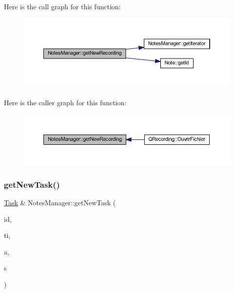 Here is the call graph for this function\+:\nopagebreak
\begin{figure}[H]
\begin{center}
\leavevmode
\includegraphics[width=350pt]{class_notes_manager_a71d0bc2e2716a4e558705ea76e3ad491_cgraph}
\end{center}
\end{figure}
Here is the caller graph for this function\+:\nopagebreak
\begin{figure}[H]
\begin{center}
\leavevmode
\includegraphics[width=350pt]{class_notes_manager_a71d0bc2e2716a4e558705ea76e3ad491_icgraph}
\end{center}
\end{figure}
\mbox{\label{class_notes_manager_a39562bf5aef0d7a113317c1421d578fd}} 
\subsubsection{\texorpdfstring{get\+New\+Task()}{getNewTask()}}
{\footnotesize\ttfamily \hyperlink{class_task}{Task} \& Notes\+Manager\+::get\+New\+Task (\begin{DoxyParamCaption}\item[{const Q\+String \&}]{id,  }\item[{const Q\+String \&}]{ti,  }\item[{const Q\+String \&}]{a,  }\item[{E\+N\+U\+M\+::\+Status\+Type}]{s }\end{DoxyParamCaption})}



